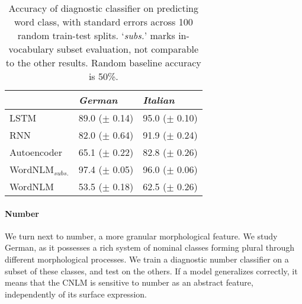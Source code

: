 \begin{table}[t]
\footnotesize
    \begin{center}
      \begin{tabular}{l|l|l}
        &\emph{German}&\emph{Italian}\\
        \hline
        LSTM & 89.0 ($\pm$ 0.14) & 95.0 ($\pm$ 0.10) \\
        RNN & 82.0 ($\pm$ 0.64) & 91.9 ($\pm$ 0.24) \\
        Autoencoder & 65.1 ($\pm$ 0.22) & 82.8 ($\pm$ 0.26) \\
	      WordNLM$_{\textit{subs.}}$ & 97.4 ($\pm$ 0.05) & 96.0 ($\pm$ 0.06) \\
	      WordNLM & 53.5 ($\pm$ 0.18)  & 62.5 ($\pm$ 0.26) \\
      \end{tabular}
    \end{center}
	\caption{\label{tab:pos-results} Accuracy of diagnostic classifier on predicting word class, with standard errors across 100 random train-test splits. `\emph{subs.}' marks in-vocabulary subset evaluation, not comparable to the other results. Random baseline accuracy is 50\%.} %
\end{table}






\paragraph{Number}
We turn next to number, a more granular morphological feature. We
study German, as it possesses a rich system of nominal classes forming
plural through different morphological processes. We train a diagnostic number
classifier on a subset of these classes, and test on the others. If a
model generalizes correctly, it means that the CNLM is sensitive to number
as an abstract feature, independently of its surface expression.

